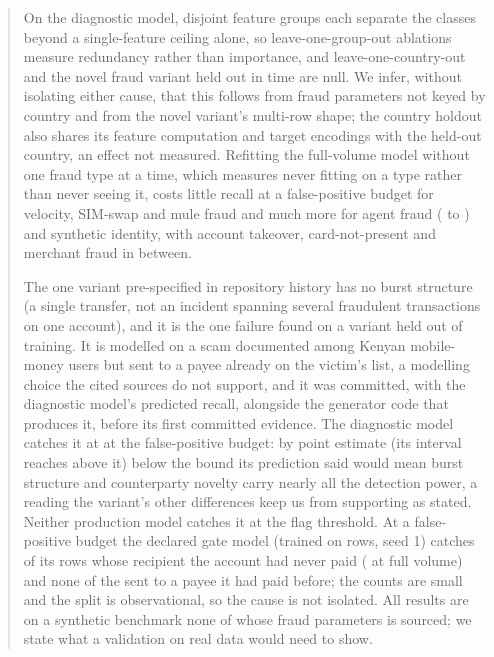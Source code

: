 \begin{abstract}
On the diagnostic model, \nGroupsAboveCeiling{} disjoint feature groups each separate the classes
beyond a \nCeiling{} single-feature ceiling alone, so leave-one-group-out ablations measure redundancy
rather than importance, and leave-one-country-out and the novel fraud variant held out in time are
null. We infer, without isolating either cause, that this follows from fraud parameters not keyed by
country and from the novel variant's multi-row shape; the country holdout also shares its feature
computation and target encodings with the held-out country, an effect not measured. Refitting the
full-volume model without one fraud type at a time, which measures never fitting on a type rather
than never seeing it, costs little recall at a \nFPRBudget{} false-positive budget for velocity,
SIM-swap and mule fraud and much more for agent fraud (\nLoAgentProd{} to \nLoAgentHeld{}) and
synthetic identity, with account takeover, card-not-present and merchant fraud in between.

The one variant pre-specified in repository history has no burst structure (a single transfer, not an
incident spanning several fraudulent transactions on one account), and it is the one failure found on a variant
held out of training. It is modelled on a scam documented among Kenyan mobile-money users but sent to a payee already
on the victim's list, a modelling choice the cited sources do not support, and it was committed, with
the diagnostic model's predicted recall, alongside the generator code that produces it, before its
first committed evidence. The diagnostic model catches it at \nRevRecall{} at the \nFPRBudget{} false-positive budget: by point estimate (its
interval reaches above it) below the bound its prediction said would mean burst structure and
counterparty novelty carry nearly all the detection power, a reading the variant's other differences
keep us from supporting as stated. Neither production model catches it at the flag threshold. At a
\nFPRBudget{} false-positive budget the declared gate model (trained on \nTrainUsed{} rows, seed 1) catches
\nGateRevNewBudgetCaught{} of its \nGateRevNewBudgetRows{} rows whose recipient the account had never
paid (\nFvRevNewBudgetCaught{} at full volume) and none of the \nGateRevKnownBudgetRows{} sent to a
payee it had paid before; the counts are small and the split is observational, so the cause is not
isolated. All results are on a synthetic benchmark none of whose fraud parameters is sourced; we state
what a validation on real data would need to show.
\end{abstract}
